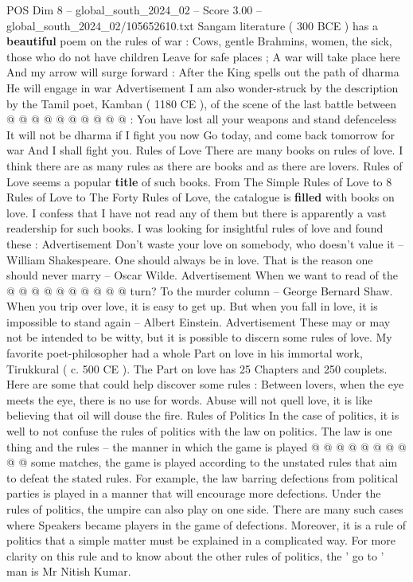 \begin{textsample}{POS Dim 8 – global\_south\_2024\_02 – Score 3.00 – global\_south\_2024\_02/105652610.txt}
Sangam literature ( 300 BCE ) has a \textbf{beautiful} poem on the rules of war : Cows, gentle Brahmins, women, the sick, those who do not have children Leave for safe places ; A war will take place here And my arrow will surge forward : After the King spells out the path of dharma He will engage in war Advertisement I am also wonder-struck by the description by the Tamil poet, Kamban ( 1180 CE ), of the scene of the last battle between @ @ @ @ @ @ @ @ @ @ : You have lost all your weapons and stand defenceless It will not be dharma if I fight you now Go today, and come back tomorrow for war And I shall fight you.
Rules of Love There are many books on rules of love.
I think there are as many rules as there are books and as there are lovers.
Rules of Love seems a popular \textbf{title} of such books.
From The Simple Rules of Love to 8 Rules of Love to The Forty Rules of Love, the catalogue is \textbf{filled} with books on love.
I confess that I have not read any of them but there is apparently a vast readership for such books.
I was looking for insightful rules of love and found these : Advertisement Don't waste your love on somebody, who doesn't value it -- William Shakespeare.
One should always be in love.
That is the reason one should never marry -- Oscar Wilde.
Advertisement When we want to read of the @ @ @ @ @ @ @ @ @ @ turn?
To the murder column -- George Bernard Shaw.
When you trip over love, it is easy to get up.
But when you fall in love, it is impossible to stand again -- Albert Einstein.
Advertisement These may or may not be intended to be witty, but it is possible to discern some rules of love.
My favorite poet-philosopher had a whole Part on love in his immortal work, Tirukkural ( c. 500 CE ).
The Part on love has 25 Chapters and 250 couplets.
Here are some that could help discover some rules : Between lovers, when the eye meets the eye, there is no use for words.
Abuse will not quell love, it is like believing that oil will douse the fire.
Rules of Politics In the case of politics, it is well to not confuse the rules of politics with the law on politics.
The law is one thing and the rules -- the manner in which the game is played @ @ @ @ @ @ @ @ @ @ some matches, the game is played according to the unstated rules that aim to defeat the stated rules.
For example, the law barring defections from political parties is played in a manner that will encourage more defections.
Under the rules of politics, the umpire can also play on one side.
There are many such cases where Speakers became players in the game of defections.
Moreover, it is a rule of politics that a simple matter must be explained in a complicated way.
For more clarity on this rule and to know about the other rules of politics, the ' go to ' man is Mr Nitish Kumar.

\end{textsample}
